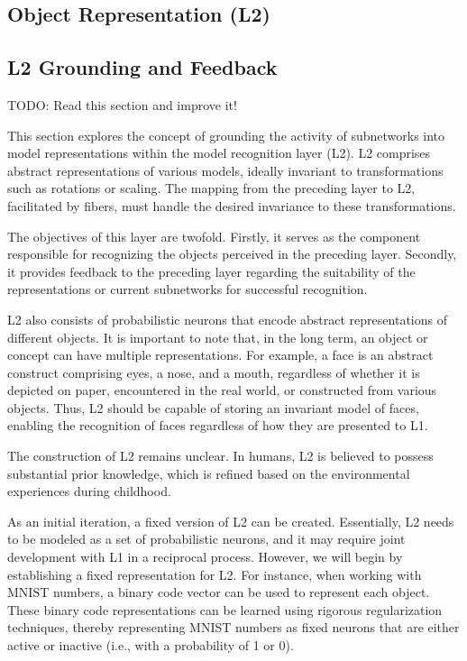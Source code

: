 \subsection{Object Representation (L2)}



\subsection{L2 Grounding and Feedback}
TODO: Read this section and improve it!

This section explores the concept of grounding the activity of subnetworks into model representations within the model recognition layer (L2). L2 comprises abstract representations of various models, ideally invariant to transformations such as rotations or scaling. The mapping from the preceding layer to L2, facilitated by fibers, must handle the desired invariance to these transformations.

The objectives of this layer are twofold. Firstly, it serves as the component responsible for recognizing the objects perceived in the preceding layer. Secondly, it provides feedback to the preceding layer regarding the suitability of the representations or current subnetworks for successful recognition.

L2 also consists of probabilistic neurons that encode abstract representations of different objects. It is important to note that, in the long term, an object or concept can have multiple representations. For example, a face is an abstract construct comprising eyes, a nose, and a mouth, regardless of whether it is depicted on paper, encountered in the real world, or constructed from various objects. Thus, L2 should be capable of storing an invariant model of faces, enabling the recognition of faces regardless of how they are presented to L1.

The construction of L2 remains unclear. In humans, L2 is believed to possess substantial prior knowledge, which is refined based on the environmental experiences during childhood.

As an initial iteration, a fixed version of L2 can be created. Essentially, L2 needs to be modeled as a set of probabilistic neurons, and it may require joint development with L1 in a reciprocal process. However, we will begin by establishing a fixed representation for L2. For instance, when working with MNIST numbers, a binary code vector can be used to represent each object. These binary code representations can be learned using rigorous regularization techniques, thereby representing MNIST numbers as fixed neurons that are either active or inactive (i.e., with a probability of 1 or 0).

